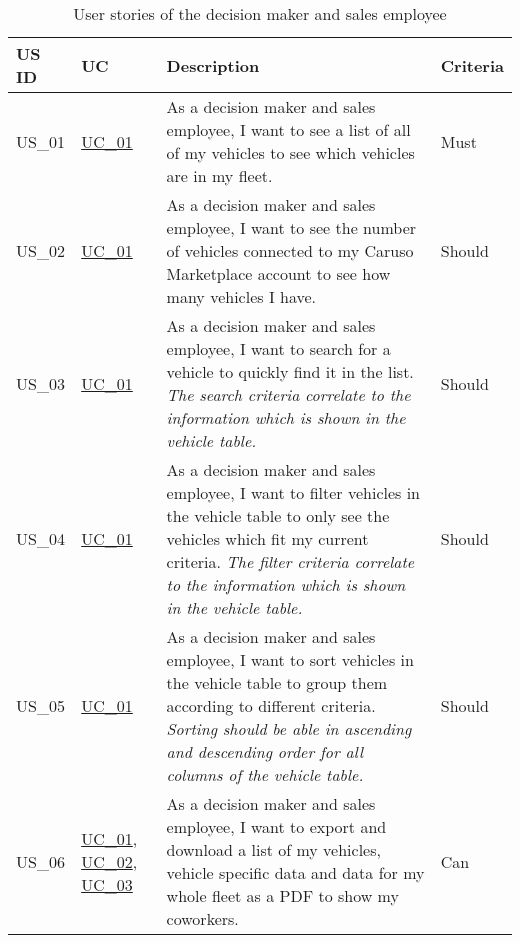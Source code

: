   \sffamily
  \begin{footnotesize}
    \begin{longtable}[L L L L]{ p{} p{} p{} p{}}
      \caption                       %
          {User stories of the decision maker and sales employee} %
          \\
      \toprule
      \textbf{US ID} & \textbf{UC} & \textbf{Description} & \textbf{Criteria} \\
      \midrule

      \hypertarget{Ref:US1}{US\_01} & \hyperlink{Ref:UC1}{UC\_01} & As a decision maker and sales employee, I want to see a list of all of my vehicles to see which vehicles are in my fleet. & Must \\ 

      \hypertarget{Ref:US2}{US\_02} & \hyperlink{Ref:UC1}{UC\_01} & As a decision maker and sales employee, I want to see the number of vehicles connected to my Caruso Marketplace account to see how many vehicles I have. & Should \\

      \hypertarget{Ref:US3}{US\_03} & \hyperlink{Ref:UC1}{UC\_01} & As a decision maker and sales employee, I want to search for a vehicle to quickly find it in the list.
      \newline
      \emph{The search criteria correlate to the information which is shown in the vehicle table.} & Should
      \\

      \hypertarget{Ref:US4}{US\_04} & \hyperlink{Ref:UC1}{UC\_01} & As a decision maker and sales employee, I want to filter vehicles in the vehicle table to only see the vehicles which fit my current criteria.
      \newline
      \emph{The filter criteria correlate to the information which is shown in the vehicle table.} & Should
      \\

      \hypertarget{Ref:US5}{US\_05} & \hyperlink{Ref:UC1}{UC\_01} & As a decision maker and sales employee, I want to sort vehicles in the vehicle table to group them according to different criteria. 
      \newline
      \emph{Sorting should be able in ascending and descending order for all columns of the vehicle table.} & Should
      \\

      \hypertarget{Ref:US6}{US\_06} & \hyperlink{Ref:UC1}{UC\_01}, \newline \hyperlink{Ref:UC2}{UC\_02}, \newline \hyperlink{Ref:UC3}{UC\_03} & As a decision maker and sales employee, I want to export and download a list of my vehicles, vehicle specific data and data for my whole fleet as a PDF to show my coworkers. & Can \\


\end{longtable}
\end{footnotesize}
